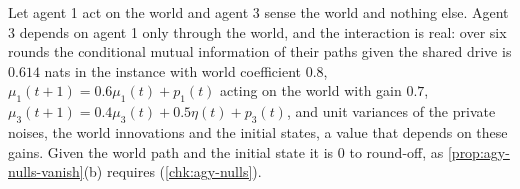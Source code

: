 \begin{example}\label{ex:agy-masking}
Let agent 1 act on the world and agent 3 sense the world and nothing else. Agent 3 depends on agent 1 only through the world, and the interaction is real: over six rounds the conditional mutual information of their paths given the shared drive is $0.614$ nats in the instance with world coefficient $0.8$, $\mu_1(t+1)=0.6\mu_1(t)+p_1(t)$ acting on the world with gain $0.7$, $\mu_3(t+1)=0.4\mu_3(t)+0.5\eta(t)+p_3(t)$, and unit variances of the private noises, the world innovations and the initial states, a value that depends on these gains. Given the world path and the initial state it is $0$ to round-off, as \cref{prop:agy-nulls-vanish}(b) requires (\cref{chk:agy-nulls}).
\end{example}

